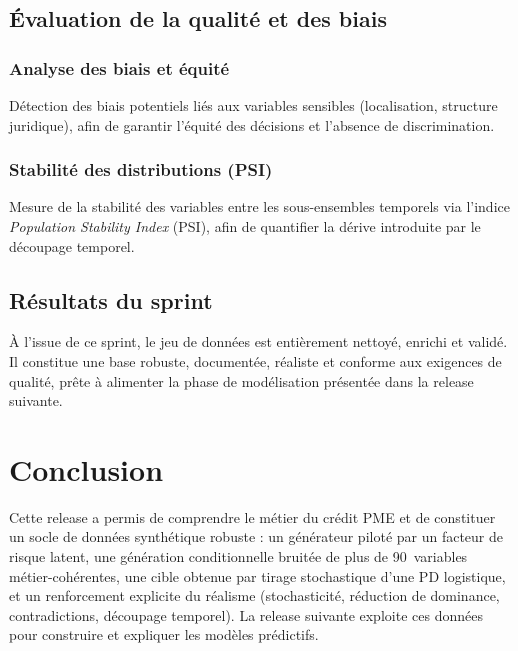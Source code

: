 \documentclass[a4paper,12pt,oneside]{report}
\begin{document}
\subsection{Évaluation de la qualité et des biais}

\subsubsection{Analyse des biais et équité}

Détection des biais potentiels liés aux variables sensibles (localisation, structure juridique),
afin de garantir l'équité des décisions et l'absence de discrimination.

\subsubsection{Stabilité des distributions (PSI)}

Mesure de la stabilité des variables entre les sous-ensembles temporels via l'indice
\textit{Population Stability Index} (PSI), afin de quantifier la dérive introduite par le
découpage temporel.

\subsection{Résultats du sprint}

À l'issue de ce sprint, le jeu de données est entièrement nettoyé, enrichi et validé. Il
constitue une base robuste, documentée, réaliste et conforme aux exigences de qualité, prête à
alimenter la phase de modélisation présentée dans la release suivante.

\section*{Conclusion}

Cette release a permis de comprendre le métier du crédit PME et de constituer un socle de
données synthétique robuste : un générateur piloté par un facteur de risque latent, une
génération conditionnelle bruitée de plus de 90~variables métier-cohérentes, une cible obtenue
par tirage stochastique d'une PD logistique, et un renforcement explicite du réalisme
(stochasticité, réduction de dominance, contradictions, découpage temporel). La release suivante
exploite ces données pour construire et expliquer les modèles prédictifs.

\end{document}

